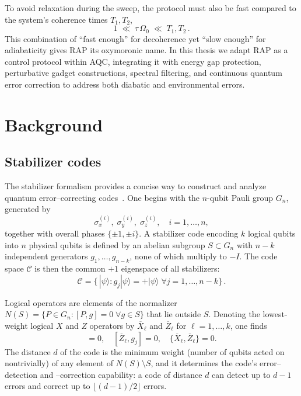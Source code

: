\documentclass[reprint, amsmath,amssymb,nofootinbib, aps,superscriptaddress,longbibliography]{revtex4-1}
\begin{document}
To avoid relaxation during the sweep, the protocol must also be fast compared to the system’s coherence times \(T_{1},T_{2}\),
\begin{equation}
1 \;\ll\; \tau\,\Omega_{0} \;\ll\; T_{1},T_{2}\,.
\end{equation}
This combination of “fast enough” for decoherence yet “slow enough” for adiabaticity gives RAP its oxymoronic name.  In this thesis we adapt RAP as a control protocol within AQC, integrating it with energy gap protection, perturbative gadget constructions, spectral filtering, and continuous quantum error correction to address both diabatic and environmental errors.



\section{Background}
\subsection{Stabilizer codes}

The stabilizer formalism provides a concise way to construct and analyze quantum error–correcting codes~\cite{gottesman1997stabilizer,jordan2005adiabatic}.  One begins with the \(n\)-qubit Pauli group \(G_n\), generated by
\begin{equation}
\sigma_x^{(i)},\;\sigma_y^{(i)},\;\sigma_z^{(i)},\quad i=1,\dots,n,
\end{equation}
together with overall phases \(\{\pm1,\pm i\}\).  A stabilizer code encoding \(k\) logical qubits into \(n\) physical qubits is defined by an abelian subgroup \(S\subset G_n\) with \(n-k\) independent generators \(g_1,\dots,g_{n-k}\), none of which multiply to \(-I\).  The code space \(\mathcal{C}\) is then the common \(+1\) eigenspace of all stabilizers:
\begin{equation}
\mathcal{C}
= \{\,|\psi\rangle : g_j|\psi\rangle = +|\psi\rangle\;\forall j=1,\dots,n-k\}\,.
\end{equation}

Logical operators are elements of the normalizer \(N(S)=\{P\in G_n : [P,g]=0\;\forall g\in S\}\) that lie outside \(S\).  Denoting the lowest-weight logical \(X\) and \(Z\) operators by \(\overline{X}_\ell\) and \(\overline{Z}_\ell\) for \(\ell=1,\dots,k\), one finds
\begin{equation}
[\overline{X}_\ell,g_j]=0,\quad [\overline{Z}_\ell,g_j]=0,\quad
\{\overline{X}_\ell,\overline{Z}_\ell\}=0.
\end{equation}
The distance \(d\) of the code is the minimum weight (number of qubits acted on nontrivially) of any element of \(N(S)\setminus S\), and it determines the code’s error–detection and –correction capability: a code of distance \(d\) can detect up to \(d-1\) errors and correct up to \(\lfloor(d-1)/2\rfloor\) errors.
\end{document}
